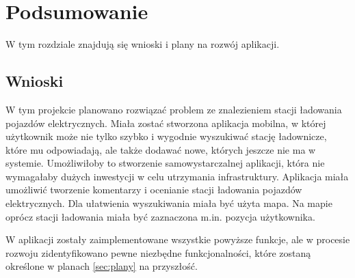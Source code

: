 \chapter{Podsumowanie}
W tym rozdziale znajdują się wnioski i plany na rozwój aplikacji.

\section{Wnioski}


W tym projekcie planowano rozwiązać problem ze znalezieniem stacji ładowania pojazdów elektrycznych. Miała zostać stworzona aplikacja mobilna, w której użytkownik może nie tylko szybko i wygodnie wyszukiwać stację ładownicze, które mu odpowiadają, ale także dodawać nowe, których jeszcze nie ma w systemie.
Umożliwiłoby to stworzenie samowystarczalnej aplikacji, która nie wymagałaby dużych inwestycji w celu utrzymania infrastruktury. Aplikacja miała umożliwić tworzenie komentarzy i ocenianie stacji ładowania pojazdów elektrycznych. Dla ułatwienia wyszukiwania miała być użyta mapa.
Na mapie oprócz stacji ładowania miała być zaznaczona m.in. pozycja użytkownika.

W aplikacji zostały zaimplementowane wszystkie powyższe funkcje, ale w procesie rozwoju zidentyfikowano pewne niezbędne funkcjonalności, które zostaną określone w planach \ref{sec:plany} na przyszłość.

